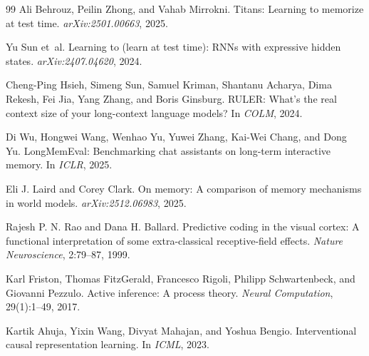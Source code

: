 \begin{thebibliography}{99}
Ali Behrouz, Peilin Zhong, and Vahab Mirrokni.
\newblock Titans: Learning to memorize at test time.
\newblock \emph{arXiv:2501.00663}, 2025.

Yu Sun et~al.
\newblock Learning to (learn at test time): RNNs with expressive hidden states.
\newblock \emph{arXiv:2407.04620}, 2024.

Cheng-Ping Hsieh, Simeng Sun, Samuel Kriman, Shantanu Acharya, Dima Rekesh,
Fei Jia, Yang Zhang, and Boris Ginsburg.
\newblock RULER: What's the real context size of your long-context language models?
\newblock In \emph{COLM}, 2024.

Di Wu, Hongwei Wang, Wenhao Yu, Yuwei Zhang, Kai-Wei Chang, and Dong Yu.
\newblock LongMemEval: Benchmarking chat assistants on long-term interactive memory.
\newblock In \emph{ICLR}, 2025.

Eli J. Laird and Corey Clark.
\newblock On memory: A comparison of memory mechanisms in world models.
\newblock \emph{arXiv:2512.06983}, 2025.

Rajesh P. N. Rao and Dana H. Ballard.
\newblock Predictive coding in the visual cortex: A functional interpretation
of some extra-classical receptive-field effects.
\newblock \emph{Nature Neuroscience}, 2:79--87, 1999.

Karl Friston, Thomas FitzGerald, Francesco Rigoli, Philipp Schwartenbeck, and
Giovanni Pezzulo.
\newblock Active inference: A process theory.
\newblock \emph{Neural Computation}, 29(1):1--49, 2017.

Kartik Ahuja, Yixin Wang, Divyat Mahajan, and Yoshua Bengio.
\newblock Interventional causal representation learning.
\newblock In \emph{ICML}, 2023.

\end{thebibliography}
